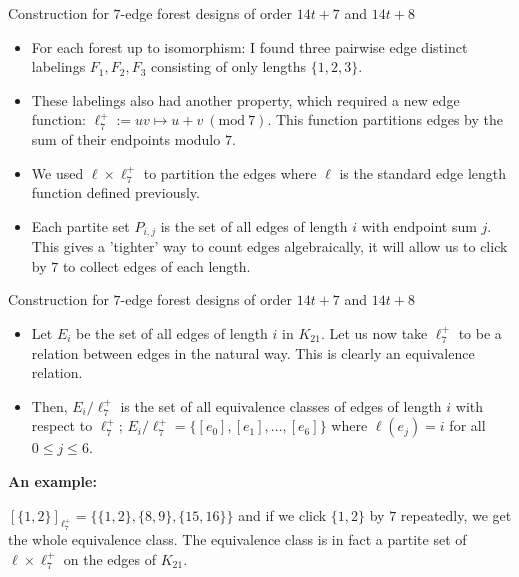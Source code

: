 \documentclass{beamer}
\theoremstyle{plain}
\newcommand{\Mod}[1]{\ (\mathrm{mod}\ #1)}
\begin{document}
    \begin{frame}{Construction for $7$-edge forest designs of order $14t+7$ and $14t+8$}

        \begin{itemize} 

        \item For each forest up to isomorphism: I found three pairwise edge distinct labelings $F_{1},F_{2},F_{3}$ consisting of only lengths $\{1,2,3\}$.
        \item These labelings also had another property, which required a new edge function: $\ell^{+}_{7}:= uv\mapsto u+v \Mod{7}$. This function partitions edges by the sum of their endpoints modulo $7$. 
        \item We used $\ell\times \ell^{+}_{7}$ to partition the edges where $\ell$ is the standard edge length function defined previously.
        \item Each partite set $P_{i,j}$ is the set of all edges of length $i$ with endpoint sum $j$. This gives a 'tighter' way to count edges algebraically, it will allow us to click by $7$ to collect edges of each length.
        
        \end{itemize}

    \end{frame}

\begin{frame}{Construction for $7$-edge forest designs of order $14t+7$ and $14t+8$}
    \begin{itemize}
    \item Let $E_{i}$ be the set of all edges of length $i$ in $K_{21}$. Let us now take $\ell^{+}_{7}$ to be a relation between edges in the natural way. This is clearly an equivalence relation. 
    \item Then, $E_{i}\slash \ell^{+}_{7}$ is the set of all equivalence classes of edges of length $i$ with respect to $\ell^{+}_{7}$; $E_{i}\slash \ell^{+}_{7}=\{[e_{0}],[e_{1}],\hdots, [e_{6}]\}$ where $\ell(e_{j})=i$ for all $0\leq j\leq 6$.
    \end{itemize}

    \textbf{An example:}

        $[\{1,2\}]_{\ell^{+}_{7}}=\{\{1,2\},\{8,9\},\{15,16\}\}$ and if we click $\{1,2\}$ by $7$ repeatedly, we get the whole equivalence class. The equivalence class is in fact a partite set of $\ell\times \ell^{+}_{7}$ on the edges of $K_{21}$.
\end{frame}
\end{document}
